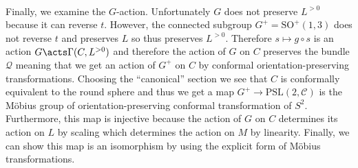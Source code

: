 \documentclass[12pt]{article}
\begin{document}
\bigskip\\
Finally, we examine the $G$-action. Unfortunately $G$ does not preserve $L^{>0}$ because it can reverse $t$. However, the connected subgroup $G^+ = \mathrm{SO}^+(1,3)$ does not reverse $t$ and preserves $L$ so thus preserves $L^{>0}$. Therefore $s \mapsto g \circ s$ is an action $G \acts \Gamma(C, L^{>0})$ and therefore the action of $G$ on $C$ preserves the bundle $\mathcal{Q}$ meaning that we get an action of $G^{+}$ on $C$ by conformal orientation-preserving transformations. Choosing the ``canonical'' section we see that $C$ is conformally equivalent to the round sphere and thus we get a map $G^{+} \to \mathrm{PSL}(2, \mathcal{C})$ is the M\"{o}bius group of orientation-preserving conformal transformation of $S^2$. Furthermore, this map is injective because the action of $G$ on $C$ determines its action on $L$ by scaling which determines the action on $M$ by linearity. Finally, we can show this map is an isomorphism by using the explicit form of M\"{o}bius transformations.
\end{document}
